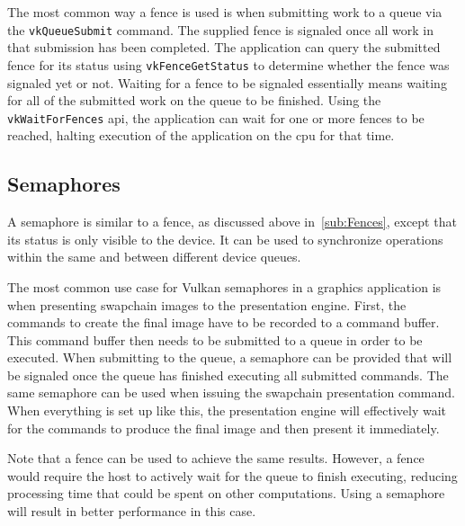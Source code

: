       The most common way a fence is used is when submitting work to a queue via the \lstinline{vkQueueSubmit} command.
      The supplied fence is signaled once all work in that submission has been completed.
      The application can query the submitted fence for its status using \lstinline{vkFenceGetStatus} to determine whether the fence was signaled yet or not.
      Waiting for a fence to be signaled essentially means waiting for all of the submitted work on the queue to be finished.
      Using the \lstinline{vkWaitForFences} \gls{api}, the application can wait for one or more fences to be reached, halting execution of the application on the \gls{cpu} for that time.

    \subsection{Semaphores}
    \label{sub:Semaphores}
      A semaphore is similar to a fence, as discussed above in~\ref{sub:Fences}, except that its status is only visible to the device.
      It can be used to synchronize operations within the same and between different device queues.

      The most common use case for Vulkan semaphores in a graphics application is when presenting swapchain images to the presentation engine.
      First, the commands to create the final image have to be recorded to a command buffer.
      This command buffer then needs to be submitted to a queue in order to be executed.
      When submitting to the queue, a semaphore can be provided that will be signaled once the queue has finished executing all submitted commands.
      The same semaphore can be used when issuing the swapchain presentation command.
      When everything is set up like this, the presentation engine will effectively wait for the commands to produce the final image and then present it immediately.

      Note that a fence can be used to achieve the same results.
      However, a fence would require the host to actively wait for the queue to finish executing, reducing processing time that could be spent on other computations.
      Using a semaphore will result in better performance in this case.

